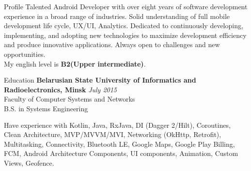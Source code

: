 \documentclass{resume} %
\begin{document}

\begin{rSection}{Profile}
Talented Android Developer with over eight years of software development experience in a broad
range of industries. Solid understanding of full mobile development life cycle, UX/UI, Analytics. Dedicated to continuously developing, implementing, and adopting new technologies to maximize development efficiency and produce innovative applications. Always open to challenges and new opportunities.\\
My english level is \textbf{B2(Upper intermediate)}.

\end{rSection}

\begin{rSection}{Education}
{\bf Belarusian State University of Informatics and Radioelectronics, Minsk} \hfill {\em July 2015} \\ 
Faculty of Computer Systems and Networks \\
B.S. in Systems Engineering \\

\end{rSection}


\begin{rSection}{Have experience with}
Kotlin, Java, RxJava, DI (Dagger 2/Hilt), Coroutines, Clean Architecture, MVP/MVVM/MVI, Networking (OkHttp, Retrofit), Multitasking, Connectivity, Bluetooth LE, Google Maps, Google Play Billing, FCM, Android Architecture Components, UI components, Animation, Custom Views, Geofence.

\end{rSection}


\end{document}

